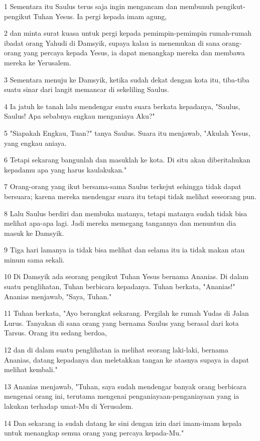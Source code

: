 \par 1 Sementara itu Saulus terus saja ingin mengancam dan membunuh pengikut-pengikut Tuhan Yesus. Ia pergi kepada imam agung,
\par 2 dan minta surat kuasa untuk pergi kepada pemimpin-pemimpin rumah-rumah ibadat orang Yahudi di Damsyik, supaya kalau ia menemukan di sana orang-orang yang percaya kepada Yesus, ia dapat menangkap mereka dan membawa mereka ke Yerusalem.
\par 3 Sementara menuju ke Damsyik, ketika sudah dekat dengan kota itu, tiba-tiba suatu sinar dari langit memancar di sekeliling Saulus.
\par 4 Ia jatuh ke tanah lalu mendengar suatu suara berkata kepadanya, "Saulus, Saulus! Apa sebabnya engkau menganiaya Aku?"
\par 5 "Siapakah Engkau, Tuan?" tanya Saulus. Suara itu menjawab, "Akulah Yesus, yang engkau aniaya.
\par 6 Tetapi sekarang bangunlah dan masuklah ke kota. Di situ akan diberitahukan kepadamu apa yang harus kaulakukan."
\par 7 Orang-orang yang ikut bersama-sama Saulus terkejut sehingga tidak dapat bersuara; karena mereka mendengar suara itu tetapi tidak melihat seseorang pun.
\par 8 Lalu Saulus berdiri dan membuka matanya, tetapi matanya sudah tidak bisa melihat apa-apa lagi. Jadi mereka memegang tangannya dan menuntun dia masuk ke Damsyik.
\par 9 Tiga hari lamanya ia tidak bisa melihat dan selama itu ia tidak makan atau minum sama sekali.
\par 10 Di Damsyik ada seorang pengikut Tuhan Yesus bernama Ananias. Di dalam suatu penglihatan, Tuhan berbicara kepadanya. Tuhan berkata, "Ananias!" Ananias menjawab, "Saya, Tuhan."
\par 11 Tuhan berkata, "Ayo berangkat sekarang. Pergilah ke rumah Yudas di Jalan Lurus. Tanyakan di sana orang yang bernama Saulus yang berasal dari kota Tarsus. Orang itu sedang berdoa,
\par 12 dan di dalam suatu penglihatan ia melihat seorang laki-laki, bernama Ananias, datang kepadanya dan meletakkan tangan ke atasnya supaya ia dapat melihat kembali."
\par 13 Ananias menjawab, "Tuhan, saya sudah mendengar banyak orang berbicara mengenai orang ini, terutama mengenai penganiayaan-penganiayaan yang ia lakukan terhadap umat-Mu di Yerusalem.
\par 14 Dan sekarang ia sudah datang ke sini dengan izin dari imam-imam kepala untuk menangkap semua orang yang percaya kepada-Mu."
